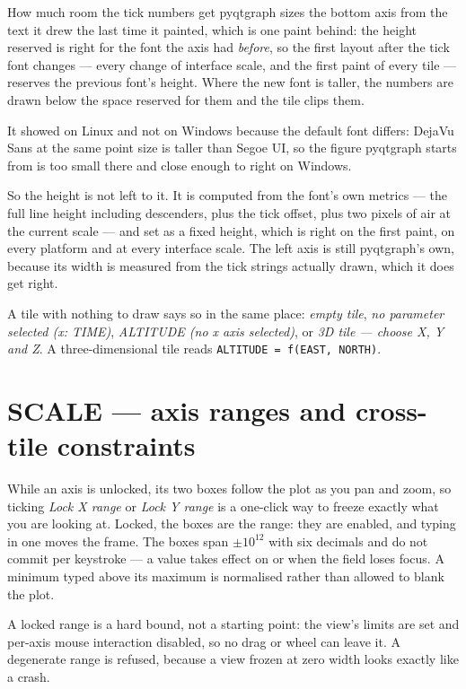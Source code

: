 \documentclass[11pt,a4paper,oneside]{report}
\newcommand{\code}[1]{\texttt{#1}}
\newcommand{\key}[1]{\textsf{\small\fbox{#1}}}
\begin{document}
\begin{aoenote}{How much room the tick numbers get}
pyqtgraph sizes the bottom axis from the text it drew the last time it painted,
which is one paint behind: the height reserved is right for the font the axis
had \emph{before}, so the first layout after the tick font changes --- every
change of interface scale, and the first paint of every tile --- reserves the
previous font's height. Where the new font is taller, the numbers are drawn
below the space reserved for them and the tile clips them.

It showed on Linux and not on Windows because the default font differs: DejaVu
Sans at the same point size is taller than Segoe UI, so the figure pyqtgraph
starts from is too small there and close enough to right on Windows.

So the height is not left to it. It is computed from the font's own metrics ---
the full line height including descenders, plus the tick offset, plus two
pixels of air at the current scale --- and set as a fixed height, which is right
on the first paint, on every platform and at every interface scale. The left
axis is still pyqtgraph's own, because its width is measured from the tick
strings actually drawn, which it does get right.
\end{aoenote}

A tile with nothing to draw says so in the same place: \emph{empty tile},
\emph{no parameter selected (x: TIME)}, \emph{ALTITUDE (no x axis selected)}, or
\emph{3D tile --- choose X, Y and Z}. A three-dimensional tile reads
\code{ALTITUDE = f(EAST, NORTH)}.

\section{SCALE --- axis ranges and cross-tile constraints}

While an axis is unlocked, its two boxes follow the plot as you pan and zoom, so
ticking \emph{Lock X range} or \emph{Lock Y range} is a one-click way to freeze
exactly what you are looking at. Locked, the boxes are the range: they are
enabled, and typing in one moves the frame. The boxes span $\pm 10^{12}$ with six
decimals and do not commit per keystroke --- a value takes effect on
\key{Enter} or when the field loses focus. A minimum typed above its maximum is
normalised rather than allowed to blank the plot.

A locked range is a hard bound, not a starting point: the view's limits are set
and per-axis mouse interaction disabled, so no drag or wheel can leave it. A
degenerate range is refused, because a view frozen at zero width looks exactly
like a crash.
\end{document}
